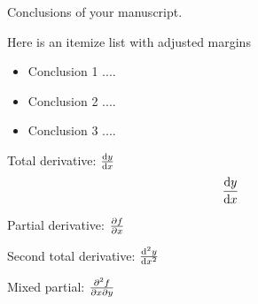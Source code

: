 Conclusions of your manuscript.

Here is an itemize list with adjusted margins
\begin{itemize}[leftmargin=0.5em, itemsep=1em]
    \item Conclusion 1 ....
    \item Conclusion 2 ....
    \item Conclusion 3 ....
\end{itemize}

Total derivative: \(\dv{y}{x}\)
\begin{align*}
    \dv{y}{x}
\end{align*}

Partial derivative: \(\pdv{f}{x}\)

Second total derivative: \(\dv[2]{y}{x}\)

Mixed partial: \(\pdv{f}{x}{y}\)
